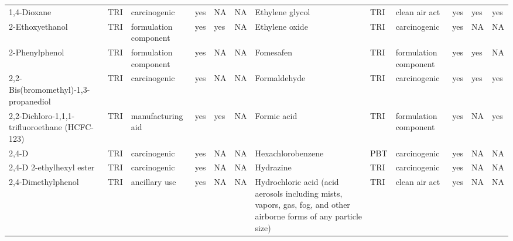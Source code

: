 \begin{table}[H]
{\begin{tabular}{llllllllllll}
            1,4-Dioxane                                                                & TRI            & carcinogenic          & yes    & NA      & NA   & Ethylene glycol                                                                                                    & TRI            & clean air act         & yes    & yes & yes\\
            2-Ethoxyethanol                                                            & TRI            & formulation component & yes    & yes     & NA   & Ethylene oxide                                                                                                     & TRI            & carcinogenic & yes & NA & NA\\
            2-Phenylphenol                                                             & TRI            & formulation component & yes    & NA      & NA   & Fomesafen                                                                                                          & TRI            & formulation component & yes & yes & NA\\
            2,2-Bis(bromomethyl)-1,3-propanediol                                       & TRI            & carcinogenic          & yes    & NA      & NA   & Formaldehyde                                                                                                       & TRI & carcinogenic & yes & yes & yes\\
            2,2-Dichloro-1,1,1-trifluoroethane (HCFC-123)                              & TRI            & manufacturing aid     & yes    & yes     & NA   & Formic acid & TRI & formulation component & yes & NA & yes\\
            2,4-D                                                                      & TRI            & carcinogenic          & yes    & NA      & NA   & Hexachlorobenzene                                                                                                  & PBT            & carcinogenic          & yes    & NA      & NA   \\
            2,4-D 2-ethylhexyl ester                                                   & TRI            & carcinogenic          & yes    & NA      & NA   & Hydrazine                                                                                                          & TRI            & carcinogenic          & yes & NA & NA\\
            2,4-Dimethylphenol                                                         & TRI            & ancillary use         & yes    & NA      & NA   & Hydrochloric acid (acid aerosols including mists, vapors, gas, fog, and other airborne forms of any particle size) & TRI & clean air act & yes & NA & NA\\

\end{tabular}}
\end{table}
